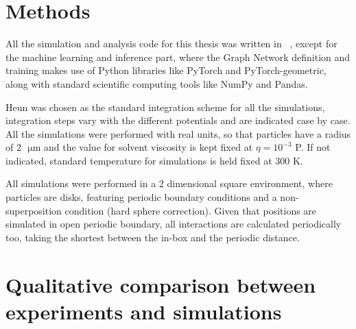 \documentclass[../../master_thesis_np.tex]{subfiles}
\begin{document}
	\section{Methods}
	All the simulation and analysis code for this thesis was written in \julia\ \cite{julia}, except for the machine learning and inference part, where the Graph Network definition and training makes use of Python libraries like PyTorch and PyTorch-geometric, along with standard scientific computing tools like NumPy and Pandas.
	
	Heun was chosen as the standard integration scheme for all the simulations, integration steps vary with the different potentials and are indicated case by case. All the simulations were performed with real units, so that particles have a radius of $2\text{ }\mathrm{\mu m}$ and the value for solvent viscosity is kept fixed at $\eta = 10^{-3}$ P. If not indicated, standard temperature for simulations is held fixed at $300$ K.
	
	All simulations were performed in a 2 dimensional square environment, where particles are disks, featuring periodic boundary conditions and a non-superposition condition (hard sphere correction). Given that positions are simulated in open periodic boundary, all interactions are calculated periodically too, taking the shortest between the in-box and the periodic distance.
	
	\section{Qualitative comparison between experiments and simulations}
	
\end{document}
